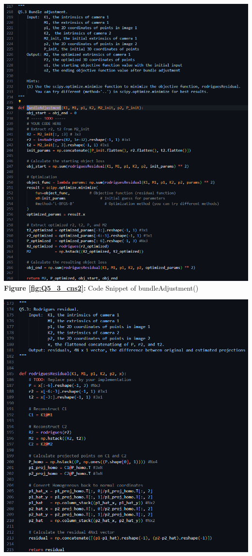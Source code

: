 \begin{your_solution}[title=Q5.3 continued,height=9.5cm,width=\linewidth]
	\begin{minipage}{0.5\linewidth}
		\centering
		\includegraphics[width=1\linewidth, height=1\columnwidth]{../Q5_3_cns2.png}
		\textbf{Figure \ref{fig:Q5_3_cns2}:} Code Snippet of bundleAdjustment()
		\label{fig:Q5_3_cns2}         %
	\end{minipage}	
	\begin{minipage}{0.5\linewidth}
		\centering
		\includegraphics[width=1\linewidth, height=1\columnwidth]{../Q5_3_cns3.png}

\end{minipage}
\end{your_solution}
